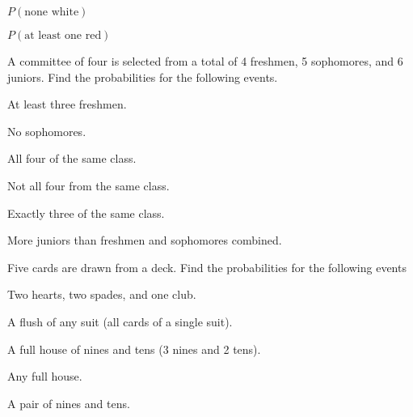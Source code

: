 \begin{puzzle}
    \( P(\text{none white})\)
\end{puzzle}

\begin{puzzle}
    \( P(\text{at least one red})\)
\end{puzzle}


A committee of four is selected from a total of 4 freshmen, 5 sophomores, and 6 juniors. Find the probabilities
for the following events.
\begin{puzzle}
    At least three freshmen.
\end{puzzle}

\begin{puzzle}
    No sophomores.
\end{puzzle}

\begin{puzzle}
    All four of the same class.
\end{puzzle}

\begin{puzzle}
    Not all four from the same class.
\end{puzzle}

\begin{puzzle}
    Exactly three of the same class.
\end{puzzle}

\begin{puzzle}
    More juniors than freshmen and sophomores combined.
\end{puzzle}


Five cards are drawn from a deck. Find the probabilities for the following events

\begin{puzzle}
    Two hearts, two spades, and one club.
\end{puzzle}

\begin{puzzle}
    A flush of any suit (all cards of a single suit).
\end{puzzle}

\begin{puzzle}
    A full house of nines and tens (3 nines and 2 tens).
\end{puzzle}

\begin{puzzle}
    Any full house.
\end{puzzle}

\begin{puzzle}
    A pair of nines and tens.
\end{puzzle}

